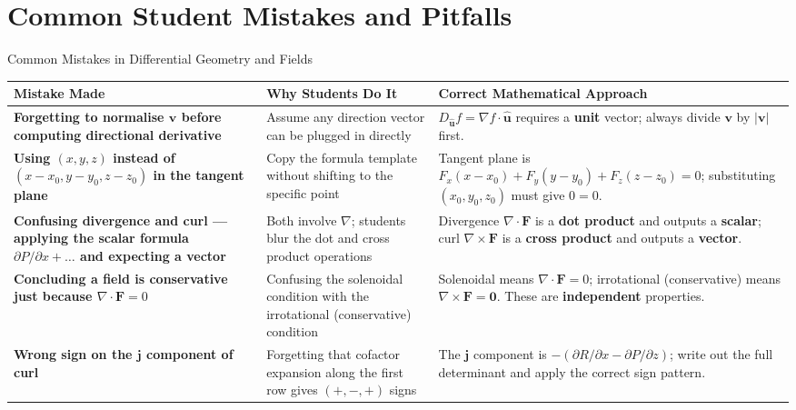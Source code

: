 \documentclass[12pt,a4paper]{article}
\begin{document}
\section{Common Student Mistakes and Pitfalls}

\begin{mistakebox}{Common Mistakes in Differential Geometry and Fields}
\begin{tabular}{>{\bfseries}p{4.2cm} p{4.5cm} p{6.0cm}}
\toprule
\textbf{Mistake Made} & \textbf{Why Students Do It} & \textbf{Correct Mathematical Approach} \\
\midrule
Forgetting to normalise $\mathbf{v}$ before computing directional derivative &
Assume any direction vector can be plugged in directly &
$D_{\hat{\mathbf{u}}} f = \nabla f \cdot \hat{\mathbf{u}}$ requires a \textbf{unit} vector; always divide $\mathbf{v}$ by $|\mathbf{v}|$ first. \\[6pt]
Using $(x, y, z)$ instead of $(x - x_0, y - y_0, z - z_0)$ in the tangent plane &
Copy the formula template without shifting to the specific point &
Tangent plane is $F_x(x-x_0)+F_y(y-y_0)+F_z(z-z_0)=0$; substituting $(x_0,y_0,z_0)$ must give $0=0$. \\[6pt]
Confusing divergence and curl --- applying the scalar formula $\partial P/\partial x + \ldots$ and expecting a vector &
Both involve $\nabla$; students blur the dot and cross product operations &
Divergence $\nabla \cdot \mathbf{F}$ is a \textbf{dot product} and outputs a \textbf{scalar}; curl $\nabla \times \mathbf{F}$ is a \textbf{cross product} and outputs a \textbf{vector}. \\[6pt]
Concluding a field is conservative just because $\nabla \cdot \mathbf{F} = 0$ &
Confusing the solenoidal condition with the irrotational (conservative) condition &
Solenoidal means $\nabla \cdot \mathbf{F} = 0$; irrotational (conservative) means $\nabla \times \mathbf{F} = \mathbf{0}$. These are \textbf{independent} properties. \\[6pt]
Wrong sign on the $\mathbf{j}$ component of curl &
Forgetting that cofactor expansion along the first row gives $(+,-,+)$ signs &
The $\mathbf{j}$ component is $-(\partial R/\partial x - \partial P/\partial z)$; write out the full determinant and apply the correct sign pattern. \\
\bottomrule
\end{tabular}
\end{mistakebox}
\end{document}
